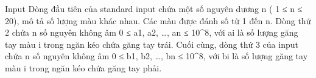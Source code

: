 Input
Dòng đầu tiên của standard input chứa một số nguyên dương n ( 1 ≤ n ≤ 20), mô tả số lượng màu khác nhau. Các màu được đánh số từ 1 đến n. Dòng thứ 2 chứa n số nguyên không âm 0 ≤ a1, a2, …, an ≤ 10^8, với ai là số lượng găng tay màu i trong ngăn kéo chứa găng tay trái. Cuối cùng, dòng thứ 3 của input chứa n số nguyên không âm 0 ≤ b1, b2, …, bn ≤ 10^8, với bi là số lượng găng tay màu i trong ngăn kéo chứa găng tay phải.